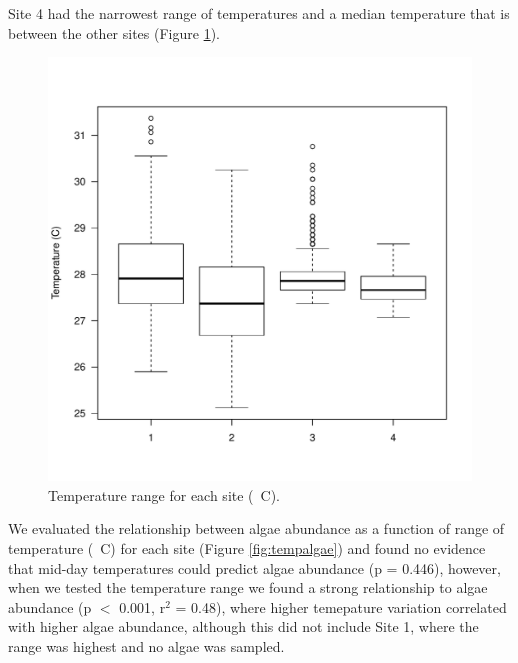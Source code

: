 \documentclass{article}\usepackage[]{graphicx}\usepackage[]{color}
\makeatletter
\def\maxwidth{ %
  \ifdim\Gin@nat@width>\linewidth
    \linewidth
  \else
    \Gin@nat@width
  \fi
}
\newenvironment{knitrout}{}{} %
\makeatother
\begin{document}
Site 4 had the narrowest range of temperatures and a median temperature that is between the other sites (Figure \ref{fig:boxplotTemp}). 

\begin{figure}
\begin{knitrout}
\color{fgcolor}
\includegraphics[width=\maxwidth]{figure/unnamed-chunk-4-1} 

\end{knitrout}
\caption{Temperature range for each site (\textdegree~C).}
\label{fig:boxplotTemp}
\end{figure}

We evaluated the relationship between algae abundance as a function of range of temperature (\textdegree~C) for each site (Figure \ref{fig:tempalgae}) and found no evidence that mid-day temperatures could predict algae abundance (p = 0.446), however, when we tested the temperature range we found a strong relationship to algae abundance (p $<$ 0.001, r$^2$ = 0.48), where higher temepature variation correlated with higher algae abundance, although this did not include Site 1, where the range was highest and no algae was sampled.
\end{document}
